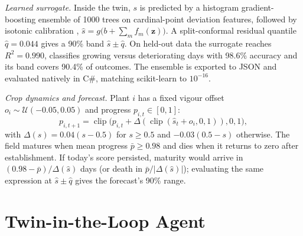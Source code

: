 \documentclass[conference]{IEEEtran}
\newcommand{\clip}{\operatorname{clip}}
\begin{document}
\textit{Learned surrogate.} Inside the twin, $s$ is predicted by a histogram gradient-boosting
ensemble \cite{friedman2001greedy,pedregosa2011scikit} of 1000 trees on
cardinal-point deviation features, followed by isotonic calibration
\cite{zadrozny2002transforming}, $\hat s=g\bigl(b+\sum_{m}f_m(\mathbf z)\bigr)$. A split-conformal
residual quantile \cite{angelopoulos2023conformal} $\hat q=0.044$ gives a 90\% band $\hat s\pm\hat q$.
On held-out data the surrogate reaches $R^2=0.990$, classifies growing versus deteriorating days
with 98.6\% accuracy and its band covers 90.4\% of outcomes. The ensemble is exported to JSON
and evaluated natively in C\#, matching scikit-learn to $10^{-16}$.

\textit{Crop dynamics and forecast.} Plant $i$ has a fixed vigour offset
$o_i\sim\mathcal U(-0.05,0.05)$ and progress $p_{i,t}\in[0,1]$:
\begin{equation}
p_{i,t+1}=\clip\bigl(p_{i,t}+\Delta(\clip(\hat s_t+o_i,0,1)),0,1\bigr),
\label{eq:progress}
\end{equation}
with $\Delta(s)=0.04(s-0.5)$ for $s\ge0.5$ and $-0.03(0.5-s)$ otherwise. The field
matures when mean progress $\bar p\ge0.98$ and dies when it returns to zero after
establishment. If today's score persisted, maturity would arrive in $(0.98-\bar p)/\Delta(\hat s)$
days (or death in $\bar p/|\Delta(\hat s)|$); evaluating the same expression at $\hat s\pm\hat q$
gives the forecast's 90\% range.

\section{Twin-in-the-Loop Agent}\label{sec:agent}
\end{document}
